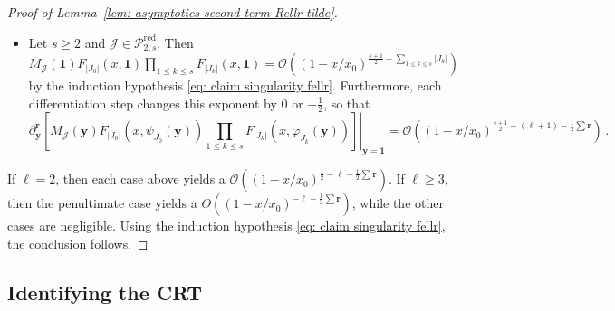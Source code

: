 \documentclass{article}
\theoremstyle{remark}
\newcommand{\cO}{\mathcal{O}}
\newcommand{\abs}[1]{{\left|#1\right|}}
\newcommand{\pairs}{{\rm B}}
\newcommand{\cJ}{\mathcal{J}}
\newcommand{\cP}{\mathcal{P}}
\newcommand{\by}{{\mathbf{y}}}
\newcommand{\br}{{\mathbf{r}}}
\newcommand{\red}{\mathrm{red}}
\begin{document}
\begin{proof}[Proof of Lemma~\ref{lem: asymptotics second term Rellr tilde}]
\begin{itemize}
\begin{itemize}
        Here, the derivative is with respect to the argument of $F_{\abs{J_1}}$ indexed by $\{i,j\}$, where we identify $[0,\abs{J_1}]$ with $\{0\} \sqcup J_1$.
    \end{itemize}
    In the end we get, with the notation of the lemma,
    \begin{multline*}
        \partial_\by^\br {\left. \left[ M_\cJ(\by) F_{\abs{J_0}}\left( x,\psi_{J_0}(\by) \right) F_{\abs{J_1}}\left( x,\varphi_{J_1}(\by) \right) \right] \right\vert_{\by=\bm{1}} } 
        \\\sim
        \sum_{\substack{ \bm{0}\preceq \bm{\alpha}\preceq \br \\ \alpha_{i,j}=r_{i,j} \text{ for all } i,j\in J_0 \\ \alpha_{i,j}=0 \text{ for all } i,j\in J_1}}
        \binom{\br}{\bm{\alpha}}
        f_{\abs{J_0}, \bm\alpha^{J_0,\ell+1}}(x)
        f_{\abs{J_1}, (\br-\bm\alpha)^{0,J_1}}(x) 
    \end{multline*}
    \item Let $s\ge2$ and $\cJ\in\cP_{2,s}^\red$.
    Then $M_\cJ(\bm{1}) F_{\abs{J_0}}(x,\bm{1}) \prod_{1\le k\le s} F_{\abs{J_k}}(x,\bm{1}) = \cO\left( (1-x/x_0)^{\frac{s+1}{2}-\sum_{1\le k\le s}\abs{J_k}} \right)$ by the induction hypothesis \eqref{eq: claim singularity fellr}.
    Furthermore, each differentiation step changes this exponent by $0$ or $-\frac12$, so that
    \[
        \partial_\by^\br \left. \left[ M_\cJ(\by) F_{\abs{J_0}}\left( x,\psi_{J_0}(\by) \right) \prod_{1\le k\le s} F_{\abs{J_k}}\left( x,\varphi_{J_k}(\by) \right) \right] \right\vert_{\by=\bm{1}} 
        = \cO\left( (1-x/x_0)^{\frac{s+1}{2}-(\ell+1)-\frac12\sum\br} \right) \,.
    \]
\end{itemize}
If $\ell=2$, then each case above yields a $\cO\left( (1-x/x_0)^{\frac12-\ell-\frac12\sum\br} \right)$.
If $\ell\ge3$, then the penultimate case yields a $\Theta\left( (1-x/x_0)^{-\ell-\frac12\sum\br} \right)$, while the other cases are negligible.
Using the induction hypothesis \eqref{eq: claim singularity fellr}, the conclusion follows.
\end{proof}


\subsection{Identifying the CRT}
\label{sec: Identifying the CRT}
\end{document}
